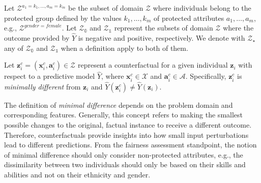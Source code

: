 \documentclass[letterpaper]{article} %
\newtheorem{definition}{Definition}
\DeclareMathOperator*{\argmin}{arg\,min}
\begin{document}
Let $\mathcal{Z}^{a_1=k_1,\dots,a_m=k_m}$ be the subset of domain $\mathcal{Z}$ where individuals belong to the protected group defined by the values $k_1,\dots,k_m$ of protected attributes $a_1,\dots,a_m$, e.g., $\mathcal{Z}^{gender=female}$.
%
Let $\mathcal{Z}_\mathbb{0}$ and $\mathcal{Z}_\mathbb{1}$ represent the subsets of domain $\mathcal{Z}$ where the outcome provided by $\hat{Y}$ is negative and positive, respectively. We denote with $\mathcal{Z}_\star$ any of $\mathcal{Z}_\mathbb{0}$ and $\mathcal{Z}_\mathbb{1}$ when a definition apply to both of them.

Let $\boldsymbol{z}_i^c = (\boldsymbol{x}_i^c, \boldsymbol{a}_i^c) \in \mathcal{Z}$ represent a counterfactual for a given individual $\boldsymbol{z}_i$ with respect to a predictive model $\hat{Y}$, where $\boldsymbol{x}_i^c \in \mathcal{X}$ and $\boldsymbol{a}_i^c \in \mathcal{A}$. Specifically, $\boldsymbol{z}_i^c$ is \emph{minimally different} from $\boldsymbol{z}_i$ and $\hat{Y}(\boldsymbol{z}_i^c) \neq \hat{Y}(\boldsymbol{z}_i)$.


The definition of \emph{minimal difference} depends on the problem domain and corresponding features. Generally, this concept refers to making the smallest possible changes to the original, factual instance to receive a different outcome. Therefore, counterfactuals provide insights into how small input perturbations lead to different predictions. From the fairness assessment standpoint, the notion of minimal difference should only consider non-protected attributes, e.g., the dissimilarity between two individuals should only be based on their skills and abilities and not on their ethnicity and gender.

\end{document}
